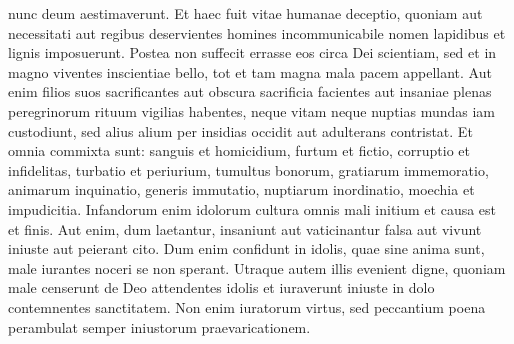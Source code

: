 \begin{biblechapter}
\begin{biblechapter}
\begin{biblechapter}
\begin{biblechapter}
\begin{biblechapter}
\begin{biblechapter}
\begin{biblechapter}
\begin{biblechapter}
\begin{biblechapter}
\begin{biblechapter}
\begin{biblechapter}
\begin{biblechapter}
\begin{biblechapter}
\begin{biblechapter}
 nunc deum aestimaverunt.
 \verse Et haec fuit vitae humanae deceptio,
 quoniam aut necessitati aut regibus deservientes homines
 incommunicabile nomen lapidibus et lignis imposuerunt.
 \verse Postea non suffecit errasse eos circa Dei scientiam,
 sed et in magno viventes inscientiae bello,
 tot et tam magna mala pacem appellant.
 \verse Aut enim filios suos sacrificantes aut obscura sacrificia facientes
 aut insaniae plenas peregrinorum rituum vigilias habentes,
 \verse neque vitam neque nuptias mundas iam custodiunt,
 sed alius alium per insidias occidit aut adulterans contristat.
 \verse Et omnia commixta sunt:
 sanguis et homicidium, furtum et fictio,
 corruptio et infidelitas, turbatio et periurium,
 \verse tumultus bonorum, gratiarum immemoratio,
 animarum inquinatio, generis immutatio,
 nuptiarum inordinatio, moechia et impudicitia.
 \verse Infandorum enim idolorum cultura
 omnis mali initium et causa est et finis.
 \verse Aut enim, dum laetantur, insaniunt aut vaticinantur falsa
 aut vivunt iniuste aut peierant cito.
 \verse Dum enim confidunt in idolis, quae sine anima sunt,
 male iurantes noceri se non sperant.
 \verse Utraque autem illis evenient digne,
 quoniam male censerunt de Deo attendentes idolis
 et iuraverunt iniuste in dolo contemnentes sanctitatem.
 \verse Non enim iuratorum virtus,
 sed peccantium poena
 perambulat semper iniustorum praevaricationem.
 

\end{biblechapter}
\end{biblechapter}
\end{biblechapter}
\end{biblechapter}
\end{biblechapter}
\end{biblechapter}
\end{biblechapter}
\end{biblechapter}
\end{biblechapter}
\end{biblechapter}
\end{biblechapter}
\end{biblechapter}
\end{biblechapter}
\end{biblechapter}
